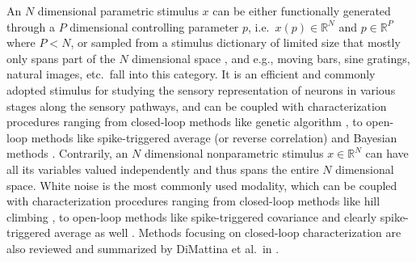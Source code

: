 An $N$ dimensional parametric stimulus $x$ can be either functionally generated through a $P$ dimensional controlling parameter $p$, i.e.~$x\left(p\right) \in \mathbb{R}^N$ and $p \in \mathbb{R}^P$ where $P < N$, or sampled from a stimulus dictionary of limited size that mostly only spans part of the $N$ dimensional space \cite{field1987relations}, and e.g., moving bars, sine gratings, natural images, etc.~fall into this category. It is an efficient and commonly adopted stimulus for studying the sensory representation of neurons in various stages along the sensory pathways, and can be coupled with characterization procedures ranging from closed-loop methods like genetic algorithm \cite{bleeck2003using, yamane2008neural}, to open-loop methods like spike-triggered average (or reverse correlation) \cite{ringach2004reverse, hansen2004parametric, dotsch2012reverse} and Bayesian methods \cite{naselaris2009bayesian, nishimoto2011reconstructing}. Contrarily, an $N$ dimensional nonparametric stimulus $x \in \mathbb{R}^N$ can have all its variables valued independently and thus spans the entire $N$ dimensional space. White noise is the most commonly used modality, which can be coupled with characterization procedures ranging from closed-loop methods like hill climbing \cite{harth1974alopex}, to open-loop methods like spike-triggered covariance \cite{touryan2002isolation, rust2004spike} and clearly spike-triggered average as well \cite{ringach2004reverse}. Methods focusing on closed-loop characterization are also reviewed and summarized by DiMattina et al.~in \cite{dimattina2013adaptive}. %


